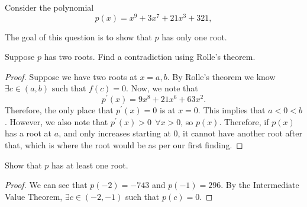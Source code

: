 \documentclass{article}
\begin{document}
    \newpage
    Consider the polynomial
    \begin{equation*}
        p(x) = x^{9} + 3x^{7} + 21x^{3} + 321,
    \end{equation*}
    
    The goal of this question is to show that $p$ has only one root.

    Suppose $p$ has two roots. Find a contradiction using Rolle's theorem.
    \begin{proof}
        Suppose we have two roots at $x = a,b$. By Rolle's theorem we know $\exists c \in (a,b) \text{ such that } f(c) = 0$.
        Now, we note that 
        \begin{equation*}
            p^{\prime}(x) = 9x^{8} + 21x^{6} + 63x^{2}.
        \end{equation*}
        Therefore, the only place that $p^{\prime}(x) = 0$ is at $x = 0$. This implies that $a < 0 < b$. However, we also note 
        that $p^{\prime}(x) > 0 \ \ \forall x > 0$, so $p(x)$. Therefore, if $p(x)$ has a root at $a$, 
        and only increases starting at 0, it cannot have another root after that, which is where the root would be as per
        our first finding. \contra
    \end{proof}

    Show that $p$ has at least one root.

    \begin{proof}
        We can see that $p(-2) = -743$ and $p(-1) = 296$. By the Intermediate Value Theorem, $\exists c \in (-2, -1)$ such that
        $p(c) = 0$.
    \end{proof}
\end{document}
